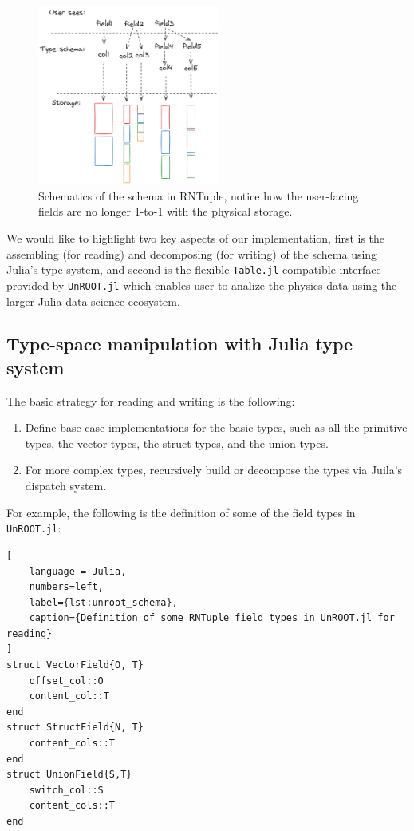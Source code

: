 \documentclass{juliacon}
\begin{document}
\begin{figure}[h]
\centerline{\includegraphics[width=6cm]{rntuple_schema.png}}
\caption{Schematics of the schema in RNTuple, notice how the user-facing fields are no longer 1-to-1
with the physical storage.}
	\label{fig:rntuple_schema}
\end{figure}

We would like to highlight two key aspects of our implementation, first is the assembling (for
reading) and decomposing (for writing) of the schema using Julia's type system, and second is the
flexible \verb|Table.jl|-compatible interface provided by \verb|UnROOT.jl| which enables user to
analize the physics data using the larger Julia data science ecosystem.

\subsection{Type-space manipulation with Julia type system}
The basic strategy for reading and writing is the following:
\begin{enumerate}
    \item Define base case implementations for the basic types, such as all the primitive types,
        the vector types, the struct types, and the union types.
    \item For more complex types, recursively build or decompose the types via Juila's dispatch
        system.
\end{enumerate}

For example, the following is the definition of some of the field types in \verb|UnROOT.jl|:
\begin{lstlisting}[
    language = Julia, 
    numbers=left, 
    label={lst:unroot_schema}, 
    caption={Definition of some RNTuple field types in UnROOT.jl for reading}
]
struct VectorField{O, T}
    offset_col::O
    content_col::T
end
struct StructField{N, T}
    content_cols::T
end
struct UnionField{S,T}
    switch_col::S
    content_cols::T
end
\end{lstlisting}
\end{document}
